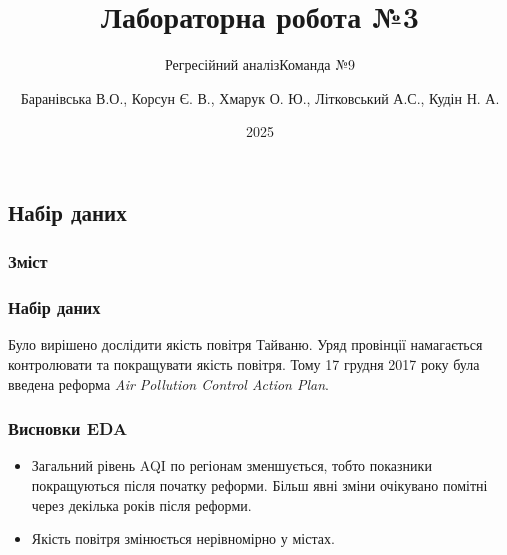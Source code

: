 ﻿\documentclass{beamer}
\title{Лабораторна робота №3}
\subtitle{Регресійний аналіз}
\subtitle{Команда №9}
\author[]{
  Баранівська В.О.,
  Корсун Є. В.,
  Хмарук О. Ю.,
  Літковський А.С.,
  Кудін Н. А.
}
\date{2025}
\begin{document}
\frame{\titlepage}

\graphicspath{{../../../}} %


\begin{frame}
  \section{Набір даних}

  \frametitle{Зміст}
  \tableofcontents[currentsection]
\end{frame}

\begin{frame}
  \frametitle{Набір даних}

  Було вирішено дослідити якість повітря Тайваню. Уряд провінції намагається
  контролювати та покращувати якість повітря. Тому 17 грудня 2017 року була введена
  реформа \textit{Air Pollution Control Action Plan}.

  \begin{center}

  \end{center}
\end{frame}

% 
% 
% 

\begin{frame}
  \frametitle{Висновки EDA}
  \begin{itemize}
    \item Загальний рівень AQI по регіонам зменшується, тобто показники покращуються після початку реформи.
    Більш явні зміни очікувано помітні через декілька років після реформи.

    \item Якість повітря змінюється нерівномірно у містах.
  \end{itemize}
\end{frame}
\end{document}
